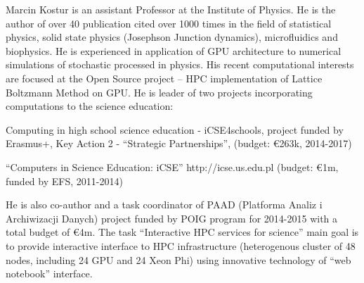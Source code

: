 \begin{participant}[type=leadPI,PM=12,gender=male]{Marcin Kostur}
is an assistant Professor at the Institute of Physics. He is the author of over 40
publication cited over 1000 times in the field of statistical physics,
solid state physics (Josephson Junction dynamics), microfluidics and
biophysics. He is experienced in application of GPU architecture to
numerical simulations of stochastic processed in physics. His recent
computational interests are focused at the Open Source project
 -- HPC implementation of Lattice Boltzmann Method on GPU.
He is leader of two projects incorporating computations to the science education:
\begin{compactitem}
\item Computing in high school science education - iCSE4schools,
  project funded by Erasmus+, Key Action 2 - ``Strategic Partnerships'',
  (budget: \euro{263}k, 2014-2017)
\item ``Computers in Science Education: iCSE'' http://icse.us.edu.pl
  (budget: \euro{1}m, funded by EFS, 2011-2014)
\end{compactitem}
He is also co-author and a task coordinator of PAAD (Platforma Analiz i
Archiwizacji Danych) project funded by POIG program for 2014-2015 with a total budget
of \euro{4}m. The task ``Interactive HPC services for science''
main goal is to provide interactive interface to HPC infrastructure
(heterogenous cluster of 48 nodes, including 24 GPU and 24 Xeon Phi)
using innovative technology of ``web notebook'' interface.  
\end{participant}
